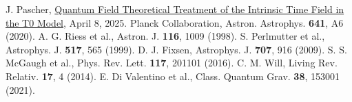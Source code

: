 \documentclass[twocolumn,aps,prl]{revtex4-2}
\begin{document}
\begin{thebibliography}{99}
		 J. Pascher, \href{https://github.com/jpascher/T0-Time-Mass-Duality/tree/main/2/pdf/English/QFTIntrinsischesZeitT0En.pdf}{Quantum Field Theoretical Treatment of the Intrinsic Time Field in the T0 Model}, April 8, 2025.
		 Planck Collaboration, Astron. Astrophys. \textbf{641}, A6 (2020).
		 A. G. Riess et al., Astron. J. \textbf{116}, 1009 (1998).
		 S. Perlmutter et al., Astrophys. J. \textbf{517}, 565 (1999).
		 D. J. Fixsen, Astrophys. J. \textbf{707}, 916 (2009).
		 S. S. McGaugh et al., Phys. Rev. Lett. \textbf{117}, 201101 (2016).
		 C. M. Will, Living Rev. Relativ. \textbf{17}, 4 (2014).
		 E. Di Valentino et al., Class. Quantum Grav. \textbf{38}, 153001 (2021).
	\end{thebibliography}
	
\end{document}
